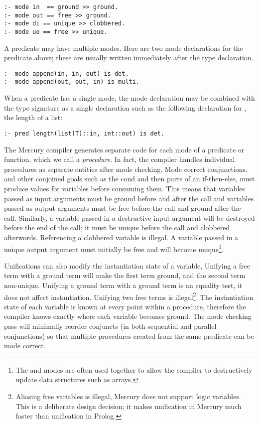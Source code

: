 \begin{verbatim}
:- mode in  == ground >> ground.
:- mode out == free >> ground.
:- mode di == unique >> clobbered.
:- mode uo == free >> unique.
\end{verbatim}

\noindent
A predicate may have multiple modes.
Here are two mode declarations for the  predicate above;
these are usually written immediately after the type declaration.

\begin{verbatim}
:- mode append(in, in, out) is det.
:- mode append(out, out, in) is multi.
\end{verbatim}

\noindent
When a predicate has a single mode,
the mode declaration may be combined with the type signature as a single
declaration such as the following declaration for ,
the length of a list:

\begin{verbatim}
:- pred length(list(T)::in, int::out) is det.
\end{verbatim}

\noindent
The Mercury compiler generates separate code
for each mode of a predicate or function,
which we call a \emph{procedure}.
In fact, the compiler handles individual procedures as separate entities
after mode checking.
Mode correct conjunctions,
and other conjoined goals such as the cond and then parts of an if-then-else,
must produce values for variables before consuming them.
This means that
variables passed as input arguments must be ground before and after the
call and
variables passed as output arguments must be free before the call and
ground after the call.
Similarly, a variable passed in a destructive input argument will be destroyed
before the end of the call;
it must be unique before the call and clobbered afterwords.
Referencing a clobbered variable is illegal.
A variable passed in a unique output argument must initially be free and
will become unique\footnote{
    The \di and \uo modes are often used together to allow the compiler to
    destructively update data structures such as arrays.}.

Unifications can also modify the instantiation state of a variable,
Unifying a free term with a ground term will make the first term ground,
and the second term non-unique.
Unifying a ground term with a ground term is an equality test,
it does not affect instantiation.
Unifying two free terms is illegal\footnote{
Aliasing free variables is illegal,
Mercury does not support logic variables.
This is a deliberate design decision;
it makes unification in Mercury much
faster than unification in Prolog.}.
The instantiation state of each variable is known at every point
within a procedure,
therefore
the compiler knows exactly where each variable becomes ground.
The mode checking pass will minimally reorder conjuncts 
(in both sequential and parallel conjunctions)
so that multiple procedures created from the same predicate can be mode
correct.

